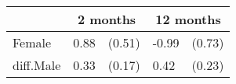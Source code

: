 {
\def\sym#1{\ifmmode^{#1}\else\(^{#1}\)\fi}
\begin{tabular*}{.65\hsize}{@{\hskip\tabcolsep\extracolsep\fill}l*{2}{lc}}
\toprule
                &\multicolumn{2}{c}{2 months}&\multicolumn{2}{c}{12 months}\\
\midrule
Female\hspace{7ex}&     0.88         &   (0.51)&    -0.99         &   (0.73)\\
diff.Male       &     0.33         &   (0.17)&     0.42         &   (0.23)\\
\bottomrule
\end{tabular*}
}
